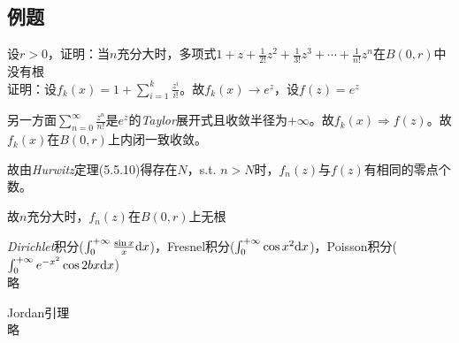 \subsection{例题}
\begin{eg}
	\color{blue}设$r>0$，证明：当$n$充分大时，多项式$1+z+\frac{1}{2!}z^2+\frac{1}{3!}z^3+\cdots +\frac{1}{n!}z^n$在$B(0,r)$中没有根\\ \color{black}
	证明：设$f_k(x)=1+\sum\limits_{i=1}^{k}{\frac{z^i}{i!}}$。故$f_k(x)\to e^z$，设$f(z)=e^z$\par
	另一方面$\sum\limits_{n=0}^{\infty}{\frac{z^n}{n!}}$是$e^z$的\emph{Taylor}展开式且收敛半径为$+\infty$。故$f_k(x)\Rightarrow f(z)$。故${f_k(x)}$在$B(0,r)$上内闭一致收敛。\par
	故由\emph{Hurwitz}定理(5.5.10)得存在$N$，s.t. $n>N$时，$f_n(z)$与$f(z)$有相同的零点个数。\par
	故$n$充分大时，$f_n(z)$在$B(0,r)$上无根
\end{eg}

\begin{eg}
	\color{blue} \emph{Dirichlet}积分($\int_0^{+\infty}\frac{\sin  x}{x}\mathrm{d}x$)，\quad Fresnel积分($ \int_0^{+\infty}\cos x^2\mathrm{d}x$)，\quad Poisson积分($\int_0^{+\infty}e^{-x^2}\cos 2bx \mathrm{d}x$)\color{black}\\
	略
\end{eg}
\begin{eg}
	\color{blue}Jordan引理 \color{black}\\
	略
\end{eg}

